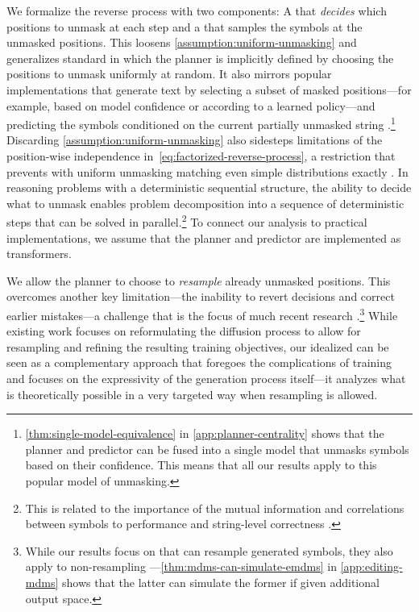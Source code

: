 \documentclass{article} %
\begin{document}
We formalize the reverse process with two components: A  that \emph{decides} which positions to unmask at each step and a  that samples the symbols at the unmasked positions.
This loosens \cref{assumption:uniform-unmasking} and generalizes standard \MDMsAcr in which the planner is implicitly defined by choosing the positions to unmask uniformly at random.
It also mirrors popular \MDMAcr implementations that generate text by selecting a subset of masked positions---for example, based on model confidence or according to a learned policy---and predicting the symbols conditioned on the current partially unmasked string \citep{ghazvininejad-etal-2019-mask,peng2025pathplanningmaskeddiffusion,zheng2024reparameterizeddiscretediffusionmodel,liu2025thinkgeneratediscretediffusion,kim2025trainworstplanbest,benhamu2025acceleratedsamplingmaskeddiffusion}.\footnote{\cref{thm:single-model-equivalence} in \cref{app:planner-centrality} shows that the planner and predictor can be fused into a single model that unmasks symbols based on their confidence.
This means that all our results apply to this popular model of unmasking.}
Discarding \cref{assumption:uniform-unmasking} also sidesteps limitations of the position-wise independence in~\cref{eq:factorized-reverse-process}, a restriction that prevents \MDMsAcr with uniform unmasking matching even simple distributions exactly \citep{feng2025theoreticalbenefitlimitationdiffusion,wu2025fastdllmtrainingfreeaccelerationdiffusion}.
In reasoning problems with a deterministic sequential structure, the ability to decide what to unmask enables problem decomposition into a sequence of deterministic steps that can be solved in parallel.\footnote{This is related to the importance of the mutual information and correlations between symbols to \MDMAcr performance \citep{li2025convergencetheorydiffusionlanguage,wu2025fastdllmtrainingfreeaccelerationdiffusion} and string-level correctness \citep{feng2025theoreticalbenefitlimitationdiffusion}.}
To connect our analysis to practical implementations, we assume that the planner and predictor are implemented as transformers.

We allow the planner to choose to \emph{resample} already unmasked positions.
This overcomes another key limitation---the inability to revert decisions and correct earlier mistakes---a challenge that is the focus of much recent research \citep[][\textit{inter alia}]{rutte2025generalized,song2025seeddiffusionlargescalediffusion}.\footnote{While our results focus on \MDMsAcr that can resample generated symbols, they also apply to non-resampling \MDMsAcr---\cref{thm:mdms-can-simulate-emdms} in \cref{app:editing-mdms} shows that the latter can simulate the former if given additional output space.}
While existing work focuses on reformulating the diffusion process to allow for resampling and refining the resulting training objectives, our idealized \MDMsAcr can be seen as a complementary approach that foregoes the complications of training and focuses on the expressivity of the generation process itself---it analyzes what is theoretically possible in a very targeted way when resampling is allowed.
\end{document}
